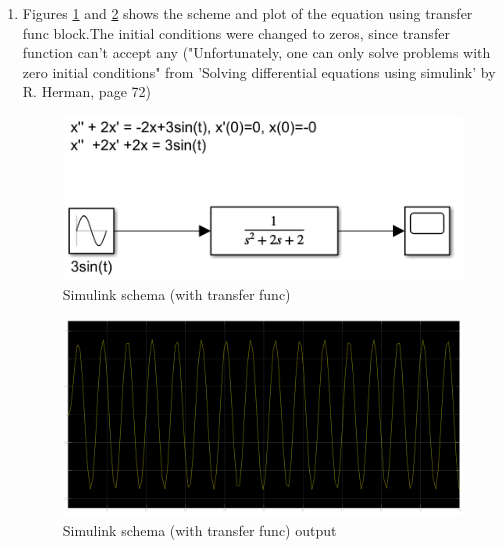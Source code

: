 \documentclass[12pt,letterpaper]{article}
\begin{document}
\begin{enumerate}[leftmargin=!,labelindent=5pt]
    \item Figures \ref{fig:2} and \ref{fig:2_out} shows the scheme and plot of the equation using transfer func block.The initial conditions were changed to zeros, since transfer function can't accept any ("Unfortunately, one can only solve problems with zero initial conditions" from 'Solving differential equations using simulink' by R. Herman, page 72)
    \begin{figure}[H]
            \centering
            \includegraphics[width=15cm]{images/schemas/ex1_transfer_scheme.png}
            \caption{Simulink schema (with transfer func)}
            \label{fig:2}
        \end{figure}
    \begin{figure}[H]
            \centering
            \includegraphics[width=15cm]{images/output/ex1_transfer_out.png}
            \caption{Simulink schema (with transfer func) output}
            \label{fig:2_out}
        \end{figure}
        

\end{enumerate}
\end{document}
